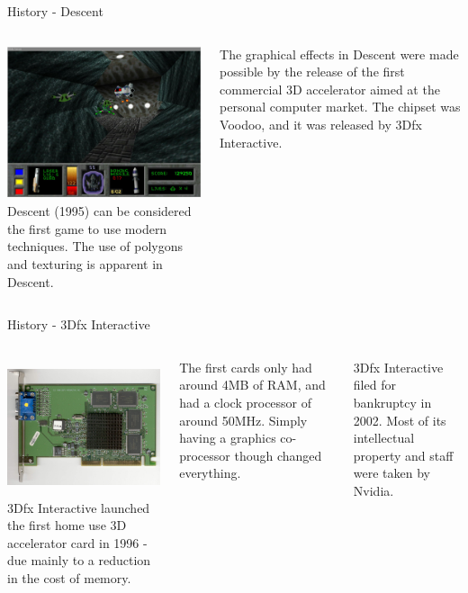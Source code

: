 \documentclass[handout,18pt]{beamer}
\begin{document}
\begin{frame}{History - Descent}
\begin{columns}
\includegraphics[height=4.5cm]{descent.jpg}
Descent (1995) can be considered the first game to use modern techniques.  The use of polygons and texturing is apparent in Descent.

\vspace{11pt}
The graphical effects in Descent were made possible by the release of the first commercial 3D accelerator aimed at the personal computer market.  The chipset was Voodoo, and it was released by 3Dfx Interactive.
\end{columns}
\end{frame}

\begin{frame}{History - 3Dfx Interactive}
\begin{columns}
\includegraphics[height=4cm]{voodoo.jpg}
3Dfx Interactive launched the first home use 3D accelerator card in 1996 - due mainly to a reduction in the cost of memory.

\vspace{11pt}
The first cards only had around 4MB of RAM, and had a clock processor of around 50MHz.  Simply having a graphics co-processor though changed everything.

\vspace{11pt}
3Dfx Interactive filed for bankruptcy in 2002.  Most of its intellectual property and staff were taken by Nvidia.
\end{columns}
\end{frame}
\end{document}
